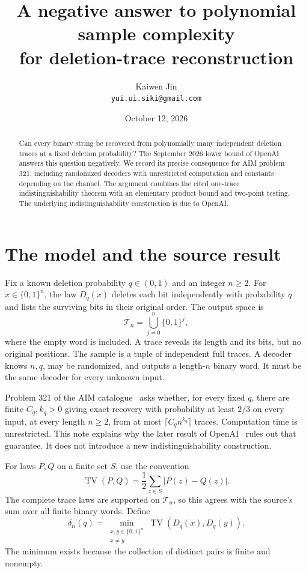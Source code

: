 \documentclass[11pt]{article}
\title{A negative answer to polynomial sample complexity\protect\\
for deletion-trace reconstruction}
\author{Kaiwen Jin\\\small\texttt{yui.ui.siki@gmail.com}}
\date{October 12, 2026}
\newcommand{\TV}{\operatorname{TV}}
\begin{document}
\maketitle
\begin{abstract}
Can every binary string be recovered from polynomially many independent
deletion traces at a fixed deletion probability? The September 2026 lower
bound of OpenAI answers this question negatively. We record its precise
consequence for AIM problem 321, including randomized decoders with
unrestricted computation and constants depending on the channel.
The argument combines the cited one-trace indistinguishability theorem with
an elementary product bound and two-point testing. The underlying
indistinguishability construction is due to OpenAI.
\end{abstract}

\section{The model and the source result}

Fix a known deletion probability $q\in(0,1)$ and an integer $n\ge2$.
For $x\in\{0,1\}^n$, the law $D_q(x)$ deletes each bit independently with
probability $q$ and lists the surviving bits in their original order.
The output space is
\[
 \mathcal T_n=\bigcup_{j=0}^n\{0,1\}^j,
\]
where the empty word is included. A trace reveals its length and its bits,
but no original positions. The sample is a tuple of independent full traces.
A decoder knows $n,q$, may be randomized, and outputs a length-$n$ binary word.
It must be the same decoder for every unknown input.

Problem 321 of the AIM catalogue~\cite{AIM321} asks whether, for every fixed
$q$, there are finite $C_q,k_q>0$ giving exact recovery with probability at
least $2/3$ on every input, at every length $n\ge2$, from at most
$\lceil C_qn^{k_q}\rceil$ traces. Computation time is unrestricted.
This note explains why the later result of OpenAI~\cite{OpenAI2026} rules out
that guarantee. It does not introduce a new indistinguishability construction.

For laws $P,Q$ on a finite set $S$, use the convention
\[
 \TV(P,Q)=\frac12\sum_{z\in S}|P(z)-Q(z)|.
\]
The complete trace laws are supported on $\mathcal T_n$, so this agrees with
the source's sum over all finite binary words. Define
\[
 \delta_n(q)=
 \min_{\substack{x,y\in\{0,1\}^n\\x\ne y}}
 \TV(D_q(x),D_q(y)).
\]
The minimum exists because the collection of distinct pairs is finite and
nonempty.
\end{document}
